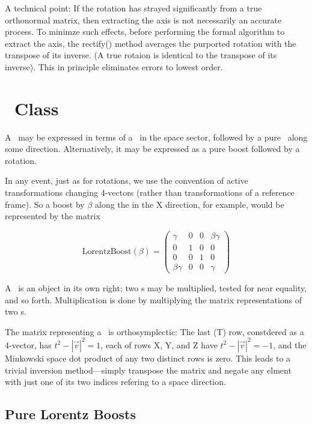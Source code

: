 A technical point:  If the rotation has strayed significantly from a true
orthonormal matrix, then extracting the axis is not necessarily an accurate
process.  To minimze such effects, before performing the formal algorithm
to extract the axis, the rectify() method averages the purported rotation 
with the transpose of its inverse.  (A true rotaion is identical to the 
transpose of its inverse).  This in principle eliminates errors to lowest 
order.


\section{\protect\LT\ Class}

A \LT\ may be
expressed in terms of a \Rotation\ in the space sector, followed by
a pure \LB\ along some direction.
Alternatively, it may be expressed as a pure boost followed by a rotation.

In any event, just as for rotations,
we use the convention of active transformations changing 4-vectors
(rather than transformations of a reference frame).  So a boost by
$\beta$ along the in the X direction, for example, would be represented by
the matrix

\begin{equation}
\label{eq:boostx}
  \mbox{LorentzBoost}(\beta) =
\left(
\begin{array}{cccc}
 \gamma & 0 & 0 & \beta \gamma \\
 0 & 1 & 0 & 0 \\
 0 & 0 & 1 & 0 \\
 \beta \gamma & 0 & 0 & \gamma
\end{array}
\right)
\end{equation}

A \LT\ is an object in its own right; two \LT s may be multiplied,
tested for near equality, and so forth.
Multiplication is done by multiplying the matrix representations of two
\LT s.

The matrix representing a \LT\ is orthosymplectic:  The last (T) row,
constdered as a 4-vector, has $ t^2 - |\vec{v}|^2 = 1 $, each of rows
X, Y, and Z have $ t^2 - |\vec{v}|^2 = -1$, and the Minkowski space
dot product of any two distinct rows
is zero.  This leads to a trivial inversion method---simply transpose the
matrix and negate any elment with just one of its two indices refering to
a space direction.

\subsection{Pure Lorentz Boosts}

